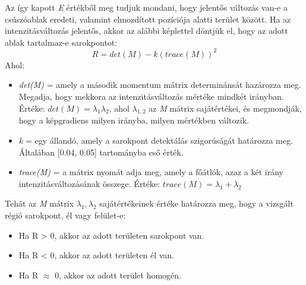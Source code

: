\documentclass[12pt]{report}
\begin{document}
\begin{enumerate}
                    Az így kapott \textit{E} értékből meg tudjuk mondani, hogy jelentős változás van-e a csúszóablak eredeti, valamint elmozdított pozíciója alatti terület között. Ha az intenzitásváltozás jelentős, akkor az alábbi képlettel döntjük el, hogy az adott ablak tartalmaz-e sarokpontot:
                    \[R = det(M) - k(trace(M))^2\]
                    Ahol:
                    \begin{itemize}
                        \item \textit{det(M)} = amely a második momentum mátrix determinánsát hazározza meg. Megadja, hogy mekkora az intenzitásváltozás mértéke mindkét irányban. Értéke: \textit{$det(M) = \lambda_1\lambda_2$}, ahol $\lambda_{1,2}$ az \textit{M} mátrix sajátértékei, és megmondják, hogy a képgradiens milyen irányba, milyen mértékben változik.
                        \item \textit{k} = egy állandó, amely a sarokpont detektálás szigorúságát határozza meg. Általában [0.04, 0.05] tartományba eső érték.
                        \item \textit{trace(M)} = a mátrix nyomát adja meg, amely a főátlók, azaz a két irány intenzitásváltozásának összege. Értéke: \textit{$trace(M) = \lambda_1 + \lambda_2$}
                    \end{itemize}
                    Tehát az \textit{M} mátrix \textit{$\lambda_1, \lambda_2$} sajátértékeinek értéke határozza meg, hogy a vizsgált régió sarokpont, él vagy felület-e:
                    \begin{itemize}
                        \item Ha R > 0, akkor az adott területen sarokpont van.
                        \item Ha R < 0, akkor az adott területen él van.
                        \item Ha R $\approx$ 0, akkor az adott terület homogén.
                    \end{itemize}


\end{enumerate}
\end{document}
